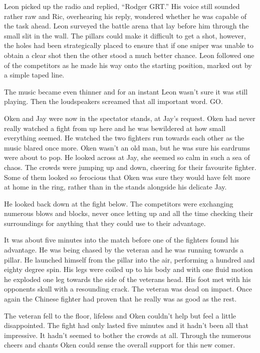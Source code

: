 Leon picked up the radio and replied, ``Rodger GRT.''  His voice still sounded rather raw and Ric, overhearing his reply, wondered whether he was capable of the task ahead.  Leon surveyed the battle arena that lay before him through the small slit in the wall.  The pillars could make it difficult to get a shot, however, the holes had been strategically placed to ensure that if one sniper was unable to obtain a clear shot then the other stood a much better chance.  Leon followed one of the competitors as he made his way onto the starting position, marked out by a simple taped line.

The music became even thinner and for an instant Leon wasn't sure it was still playing.  Then the loudspeakers screamed that all important word.  GO.



\thoughtbreak



Oken and Jay were now in the spectator stands, at Jay's request.  Oken had never really watched a fight from up here and he was bewildered at how small everything seemed.  He watched the two fighters run towards each other as the music blared once more.  Oken wasn't an old man, but he was sure his eardrums were about to pop.  He looked across at Jay, she seemed so calm in such a sea of chaos.  The crowds were jumping up and down, cheering for their favourite fighter.  Some of them looked so ferocious that Oken was sure they would have felt more at home in the ring, rather than in the stands alongside his delicate Jay.

He looked back down at the fight below.  The competitors were exchanging numerous blows and blocks, never once letting up and all the time checking their surroundings for anything that they could use to their advantage.

It was about five minutes into the match before one of the fighters found his advantage.  He was being chased by the veteran and he was running towards a pillar.  He launched himself from the pillar into the air, performing a hundred and eighty degree spin.  His legs were coiled up to his body and with one fluid motion he exploded one leg towards the side of the veterans head.  His foot met with his opponents skull with a resounding crack.  The veteran was dead on impact.  Once again the Chinese fighter had proven that he really was as good as the rest.

The veteran fell to the floor, lifeless and Oken couldn't help but feel a little disappointed.  The fight had only lasted five minutes and it hadn't been all that impressive.  It hadn't seemed to bother the crowds at all.  Through the numerous cheers and chants Oken could sense the overall support for this new comer.

